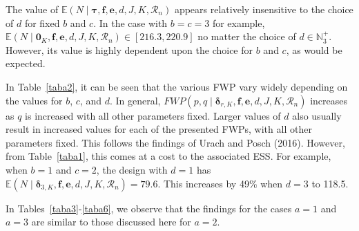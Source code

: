 \documentclass{article}
\numberwithin{equation}{section}
\theoremstyle{plain}
\begin{document}
The value of $\mathbb{E}(N\mid\boldsymbol{\tau},\boldsymbol{f},\boldsymbol{e},d,J,K,\mathscr{R}_n)$ appears relatively insensitive to the choice of $d$ for fixed $b$ and $c$. In the case with $b=c=3$ for example, $\mathbb{E}(N\mid\boldsymbol{0}_K,\boldsymbol{f},\boldsymbol{e},d,J,K,\mathscr{R}_n)\in[216.3,220.9]$ no matter the choice of $d\in\mathbb{N}_3^+$. However, its value is highly dependent upon the choice for $b$ and $c$, as would be expected.

In Table~\ref{taba2}, it can be seen that the various FWP vary widely depending on the values for $b$, $c$, and $d$. In general, $FWP(p,q\mid \boldsymbol{\delta}_{r,K},\boldsymbol{f},\boldsymbol{e},d,J,K,\mathscr{R}_n)$ increases as $q$ is increased with all other parameters fixed. Larger values of $d$ also usually result in increased values for each of the presented FWPs, with all other parameters fixed. This follows the findings of Urach and Posch (2016). However, from Table~\ref{taba1}, this comes at a cost to the associated ESS. For example, when $b=1$ and $c=2$, the design with $d=1$ has $\mathbb{E}(N\mid\boldsymbol{\delta}_{3,K},\boldsymbol{f},\boldsymbol{e},d,J,K,\mathscr{R}_n)=79.6$. This increases by 49\% when $d=3$ to 118.5.

In Tables~\ref{taba3}-\ref{taba6}, we observe that the findings for the cases $a=1$ and $a=3$ are similar to those discussed here for $a=2$.
\end{document}
